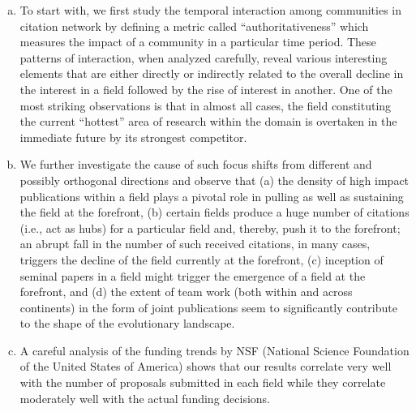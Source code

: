 \begin{enumerate}[(a)]
 \item To start with, we first study the temporal interaction among communities in citation network by defining  a metric called
``authoritativeness'' which measures the impact of a community in a particular time period. These patterns of interaction, when analyzed
carefully, reveal various interesting elements that are either directly or indirectly related to the overall decline in the interest in a
field followed by the rise of interest in another. One of the most striking observations is that in almost all cases, the
field constituting the current ``hottest'' area of research within the domain is overtaken in the immediate future by its strongest
competitor.

\item We further investigate the cause of such focus shifts from different and possibly orthogonal directions and observe
that (a) the density of high impact publications within a field plays a pivotal role in pulling as well as sustaining the field at the
forefront, (b) certain fields produce a huge number of citations (i.e., act as hubs) for a particular field and, thereby, push it to the
forefront; an abrupt fall in the number of such received citations, in many cases, triggers the decline of the field currently at the
forefront, (c) inception of seminal papers in a field might trigger the emergence of a field at the forefront, and (d) the extent of
team work (both within and across continents) in the form of joint publications seem to significantly contribute to the shape of the
evolutionary landscape.



\item  A careful analysis of the funding trends by NSF (National Science Foundation of the United States
of America) shows that our results correlate very well with the number of proposals submitted in each field while they correlate moderately
well with the actual funding decisions. 

\end{enumerate}

